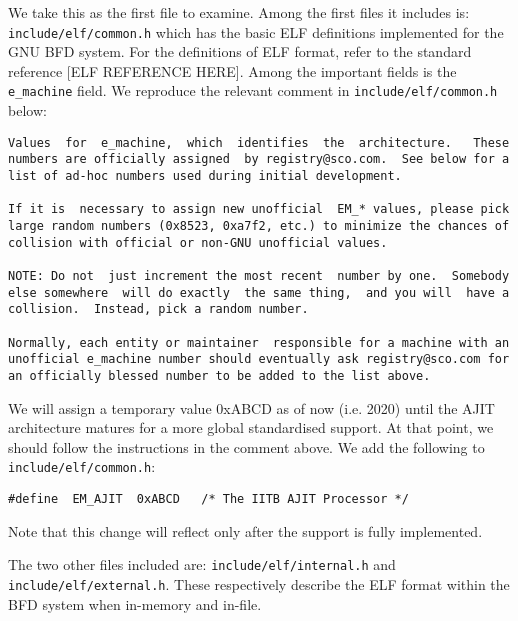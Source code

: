 We take this  as the first file to examine.  Among  the first files it
includes  is: \texttt{include/elf/common.h}  which has  the  basic ELF
definitions implemented  for the GNU BFD system.   For the definitions
of ELF format,  refer to the standard reference  [ELF REFERENCE HERE].
Among  the  important fields  is  the  \texttt{e\_machine} field.   We
reproduce the relevant comment in \texttt{include/elf/common.h} below:
\begin{verbatim}
Values  for  e_machine,  which  identifies  the  architecture.   These
numbers are officially assigned  by registry@sco.com.  See below for a
list of ad-hoc numbers used during initial development.

If it is  necessary to assign new unofficial  EM_* values, please pick
large random numbers (0x8523, 0xa7f2, etc.) to minimize the chances of
collision with official or non-GNU unofficial values.

NOTE: Do not  just increment the most recent  number by one.  Somebody
else somewhere  will do exactly  the same thing,  and you will  have a
collision.  Instead, pick a random number.

Normally, each entity or maintainer  responsible for a machine with an
unofficial e_machine number should eventually ask registry@sco.com for
an officially blessed number to be added to the list above.
\end{verbatim}
We will  assign a temporary value  0xABCD as of now  (i.e. 2020) until
the AJIT architecture matures  for a more global standardised support.
At that point, we should follow the instructions in the comment above.
We add the following to \texttt{include/elf/common.h}:

\verb|#define  EM_AJIT  0xABCD   /* The IITB AJIT Processor */|

Note that  this change  will reflect only  after the support  is fully
implemented.

The two other  files included are: \texttt{include/elf/internal.h} and
\texttt{include/elf/external.h}.  These  respectively describe the ELF
format within the BFD system when in-memory and in-file.

